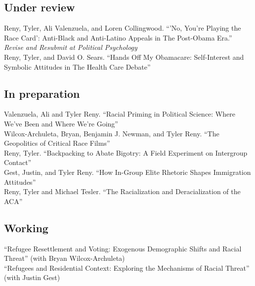 \documentclass[11pt, a4paper]{article}
\newcommand{\years}[1]{\marginnote{\scriptsize #1}}
\begin{document}
\subsection*{Under review}

\years{} Reny, Tyler, Ali Valenzuela, and Loren Collingwood. ``'No, You’re Playing the Race Card': Anti-Black and Anti-Latino Appeals in The Post-Obama Era.'' \textit{Revise and Resubmit at Political Psychology}\\

\years{} Reny, Tyler, and David O. Sears. ``Hands Off My Obamacare: Self-Interest and Symbolic Attitudes in The Health Care Debate''\\

\subsection*{In preparation}

\years{}Valenzuela, Ali and Tyler Reny. ``Racial Priming in Political Science: Where We've Been and Where We're Going''\\
\years{} Wilcox-Archuleta, Bryan, Benjamin J. Newman, and Tyler Reny. ``The Geopolitics of Critical Race Films''\\
\years{} Reny, Tyler. ``Backpacking to Abate Bigotry: A Field Experiment on Intergroup Contact''\\
\years{} Gest, Justin, and Tyler Reny. ``How In-Group Elite Rhetoric Shapes Immigration Attitudes''\\
\years{} Reny, Tyler and Michael Tesler. ``The Racialization and Deracialization of the ACA''\\

\subsection*{Working}

\years{}``Refugee Resettlement and Voting: Exogenous Demographic Shifts and Racial Threat'' (with Bryan Wilcox-Archuleta)\\
\years{}``Refugees and Residential Context: Exploring the Mechanisms of Racial Threat'' (with Justin Gest)\\
\end{document}
